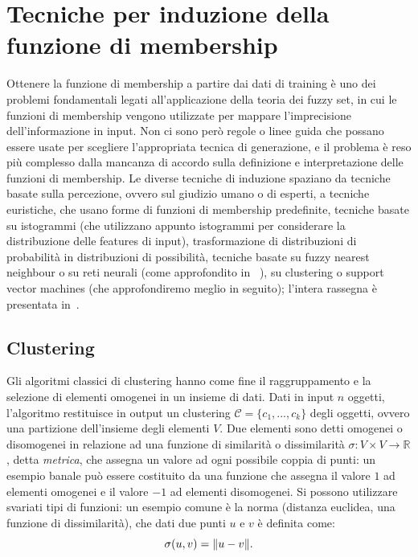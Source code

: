 \documentclass[oneside, openany]{book}
\DeclarePairedDelimiter{\norma}{\lVert}{\rVert}
\begin{document}
		\chapter{Tecniche per induzione della funzione di membership}
		Ottenere la funzione di membership a partire dai dati di training è uno dei problemi fondamentali legati all'applicazione della teoria dei fuzzy set, in cui le funzioni di membership vengono utilizzate per mappare l'imprecisione dell'informazione in input. Non ci sono però regole o linee guida che possano essere usate per scegliere l'appropriata tecnica di generazione, e il problema è reso più complesso dalla mancanza di accordo sulla definizione e interpretazione delle funzioni di membership. Le diverse tecniche di induzione spaziano da tecniche basate sulla percezione, ovvero sul giudizio umano o di esperti, a tecniche euristiche, che usano forme di funzioni di membership predefinite, tecniche basate su istogrammi (che utilizzano appunto istogrammi per considerare la distribuzione delle features di input), trasformazione di distribuzioni di probabilità in distribuzioni di possibilità, tecniche basate su fuzzy nearest neighbour o su reti neurali (come approfondito in ~\cite{bib:rita}), su clustering o support vector machines (che approfondiremo meglio in seguito); l'intera rassegna è presentata in~\cite{bib:rassegna}.
		
		\section{Clustering}
		Gli algoritmi classici di clustering hanno come fine il raggruppamento e la selezione di elementi omogenei in un insieme di dati. Dati in input $n$ oggetti, l'algoritmo restituisce in output un clustering $\mathcal{C}=\{c_1, ..., c_k\}$ degli oggetti, ovvero una partizione dell'insieme degli elementi $V$. Due elementi sono detti omogenei o disomogenei in relazione ad una funzione di similarità o dissimilarità $\sigma: V\times V\rightarrow \mathbb{R}$, detta \textit{metrica}, che assegna un valore ad ogni possibile coppia di punti: un esempio banale può essere costituito da una funzione che assegna il valore $1$ ad elementi omogenei e il valore $-1$ ad elementi disomogenei. Si possono utilizzare svariati tipi di funzioni: un esempio comune è la norma (distanza euclidea, una funzione di dissimilarità), che dati due punti $u$ e $v$ è definita come:
		\[
			\sigma(u, v) = \norma{u - v}\text{.}
		\]
		
\end{document}
